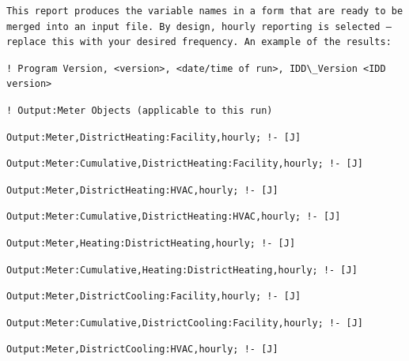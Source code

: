 \begin{lstlisting}
This report produces the variable names in a form that are ready to be merged into an input file. By design, hourly reporting is selected – replace this with your desired frequency. An example of the results:
\end{lstlisting}

\begin{lstlisting}
! Program Version, <version>, <date/time of run>, IDD\_Version <IDD version>
\end{lstlisting}

\begin{lstlisting}
! Output:Meter Objects (applicable to this run)
\end{lstlisting}

\begin{lstlisting}
Output:Meter,DistrictHeating:Facility,hourly; !- [J]
\end{lstlisting}

\begin{lstlisting}
Output:Meter:Cumulative,DistrictHeating:Facility,hourly; !- [J]
\end{lstlisting}

\begin{lstlisting}
Output:Meter,DistrictHeating:HVAC,hourly; !- [J]
\end{lstlisting}

\begin{lstlisting}
Output:Meter:Cumulative,DistrictHeating:HVAC,hourly; !- [J]
\end{lstlisting}

\begin{lstlisting}
Output:Meter,Heating:DistrictHeating,hourly; !- [J]
\end{lstlisting}

\begin{lstlisting}
Output:Meter:Cumulative,Heating:DistrictHeating,hourly; !- [J]
\end{lstlisting}

\begin{lstlisting}
Output:Meter,DistrictCooling:Facility,hourly; !- [J]
\end{lstlisting}

\begin{lstlisting}
Output:Meter:Cumulative,DistrictCooling:Facility,hourly; !- [J]
\end{lstlisting}

\begin{lstlisting}
Output:Meter,DistrictCooling:HVAC,hourly; !- [J]
\end{lstlisting}

